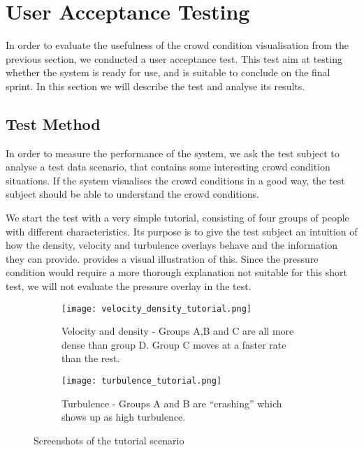 \section{User Acceptance Testing} \label{sec:s4_test}

In order to evaluate the usefulness of the crowd condition visualisation from the previous section, we conducted a user acceptance test. This test aim at testing whether the system is ready for use, and is suitable to conclude on the final sprint. In this section we will describe the test and analyse its results.

\subsection{Test Method}


In order to measure the performance of the system, we ask the test subject to analyse a test data scenario, that contains some interesting crowd condition situations. If the system visualises the crowd conditions in a good way, the test subject should be able to understand the crowd conditions.

We start the test with a very simple tutorial, consisting of four groups of people with different characteristics. Its purpose is to give the test subject an intuition of how the density, velocity and turbulence overlays behave and the information they can provide.  provides a visual illustration of this. Since the pressure condition would require a more thorough explanation not suitable for this short test, we will not evaluate the pressure overlay in the test.

\begin{figure}[htbp]
\begin{subfigure}[t]{.49\linewidth}
    \centering
    \texttt{[image: velocity\_density\_tutorial.png]}
    \caption{Velocity and density - Groups A,B and C are all more dense than group D. Group C moves at a faster rate than the rest.}
\end{subfigure}
\enspace
\begin{subfigure}[t]{.49\linewidth}
    \centering
    \texttt{[image: turbulence\_tutorial.png]}
    \caption{Turbulence - Groups A and B are \enquote{crashing} which shows up as high turbulence.}
\end{subfigure}
\caption{Screenshots of the tutorial scenario}
\label{fig:tutorial_screens}
\end{figure}

